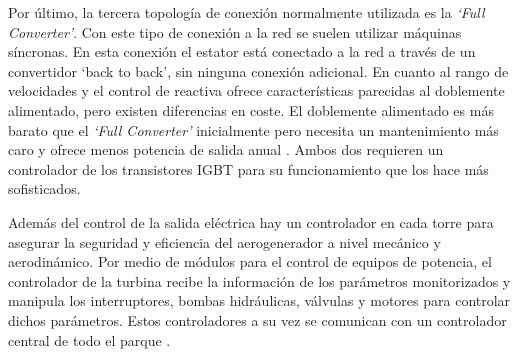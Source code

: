 \documentclass{book}
\begin{document}
		Por \'ultimo, la tercera topolog\'ia de conexi\'on normalmente utilizada es la \emph{‘Full Converter’}. Con este tipo de conexi\'on a la red se suelen utilizar m\'aquinas s\'incronas. En esta conexi\'on el estator est\'a conectado a la red a trav\'es de un convertidor ‘back to back’, sin ninguna conexi\'on adicional. En cuanto al rango de velocidades y el control de reactiva ofrece caracter\'isticas parecidas al doblemente alimentado, pero existen diferencias en coste. El doblemente alimentado es m\'as barato que el \emph{‘Full Converter’} inicialmente pero necesita un mantenimiento m\'as caro y ofrece menos potencia de salida anual \cite{PMGvsDFIG}. Ambos dos requieren un controlador de los transistores IGBT para su funcionamiento que los hace m\'as sofisticados.  \par
		Adem\'as del control de la salida el\'ectrica hay un controlador en cada torre para asegurar la seguridad y eficiencia del aerogenerador a nivel mec\'anico y aerodin\'amico. Por medio de m\'odulos para el control de equipos de potencia, el controlador de la turbina recibe la informaci\'on de los par\'ametros monitorizados y manipula los interruptores, bombas hidr\'aulicas, v\'alvulas y motores para controlar dichos par\'ametros. Estos controladores a su vez se comunican con un controlador central de todo el parque \cite{ComunicationControl}.  \par
\end{document}
